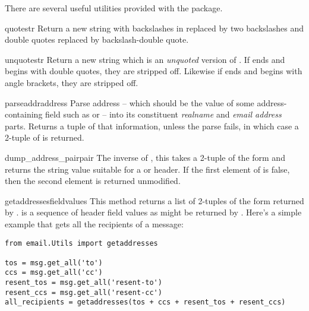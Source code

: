 
There are several useful utilities provided with the 
package.

\begin{funcdesc}{quote}{str}
Return a new string with backslashes in  replaced by two
backslashes and double quotes replaced by backslash-double quote.
\end{funcdesc}

\begin{funcdesc}{unquote}{str}
Return a new string which is an \emph{unquoted} version of .
If  ends and begins with double quotes, they are stripped
off.  Likewise if  ends and begins with angle brackets, they
are stripped off.
\end{funcdesc}

\begin{funcdesc}{parseaddr}{address}
Parse address -- which should be the value of some address-containing
field such as  or  -- into its constituent
\emph{realname} and \emph{email address} parts.  Returns a tuple of that
information, unless the parse fails, in which case a 2-tuple of
 is returned.
\end{funcdesc}

\begin{funcdesc}{dump_address_pair}{pair}
The inverse of , this takes a 2-tuple of the form
 and returns the string value suitable
for a  or  header.  If the first element of
 is false, then the second element is returned unmodified.
\end{funcdesc}

\begin{funcdesc}{getaddresses}{fieldvalues}
This method returns a list of 2-tuples of the form returned by
.   is a sequence of header field
values as might be returned by .  Here's a
simple example that gets all the recipients of a message:

\begin{verbatim}
from email.Utils import getaddresses

tos = msg.get_all('to')
ccs = msg.get_all('cc')
resent_tos = msg.get_all('resent-to')
resent_ccs = msg.get_all('resent-cc')
all_recipients = getaddresses(tos + ccs + resent_tos + resent_ccs)
\end{verbatim}
\end{funcdesc}

